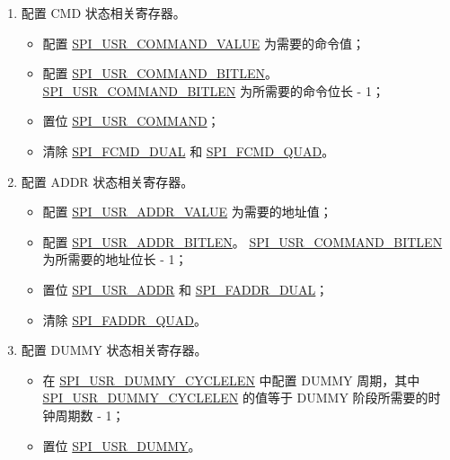 \documentclass[main\_\_CN.tex]{subfiles}
\begin{document}
\begin{enumerate}
    \item 配置 CMD 状态相关寄存器。
        \begin{itemize}
            \item 配置 \hyperref[fielddesc:SPIUSRCOMMANDVALUE]{SPI\_USR\_COMMAND\_VALUE} 为需要的命令值；
            \item 配置 \hyperref[fielddesc:SPIUSRCOMMANDBITLEN]{SPI\_USR\_COMMAND\_BITLEN}。 \hyperref[fielddesc:SPIUSRCOMMANDBITLEN]{SPI\_USR\_COMMAND\_BITLEN} 为所需要的命令位长 - 1；
            \item 置位 \hyperref[fielddesc:SPIUSRCOMMAND]{SPI\_USR\_COMMAND}；
            \item 清除 \hyperref[fielddesc:SPIFCMDDUAL]{SPI\_FCMD\_DUAL} 和 \hyperref[fielddesc:SPIFCMDQUAD]{SPI\_FCMD\_QUAD}。
        \end{itemize}
        
    \item 配置 ADDR 状态相关寄存器。
        \begin{itemize}
            \item 配置 \hyperref[fielddesc:SPIUSRADDRVALUE]{SPI\_USR\_ADDR\_VALUE} 为需要的地址值；
            \item 配置 \hyperref[fielddesc:SPIUSRADDRBITLEN]{SPI\_USR\_ADDR\_BITLEN}。 \hyperref[fielddesc:SPIUSRADDRBITLEN]{SPI\_USR\_COMMAND\_BITLEN} 为所需要的地址位长 - 1；
            \item 置位 \hyperref[fielddesc:SPIUSRADDR]{SPI\_USR\_ADDR} 和 \hyperref[fielddesc:SPIFADDRDUAL]{SPI\_FADDR\_DUAL}；
            \item 清除 \hyperref[fielddesc:SPIFADDRQUAD]{SPI\_FADDR\_QUAD}。
        \end{itemize}
        
    \item 配置 DUMMY 状态相关寄存器。
        \begin{itemize}
            \item 在 \hyperref[fielddesc:SPIUSRDUMMYCYCLELEN]{SPI\_USR\_DUMMY\_CYCLELEN} 中配置 DUMMY 周期，其中 \hyperref[fielddesc:SPIUSRDUMMYCYCLELEN]{SPI\_USR\_DUMMY\_CYCLELEN} 的值等于 DUMMY 阶段所需要的时钟周期数 - 1；
            \item 置位 \hyperref[fielddesc:SPIUSRDUMMY]{SPI\_USR\_DUMMY}。
        \end{itemize}        
        

\end{enumerate}
\end{document}
